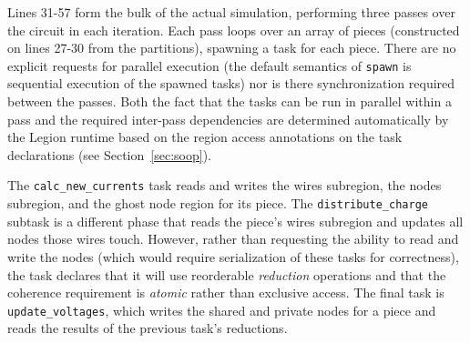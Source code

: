


Lines 31-57 form the bulk of the actual simulation, performing three passes
over the circuit in each iteration.  Each pass loops over an array of pieces (constructed on lines 27-30 from the partitions),
spawning a task for each piece.   There are no explicit requests for
parallel execution (the default semantics of {\tt spawn} is sequential 
execution of the spawned tasks) nor is there synchronization required between the
passes.  Both the fact that the tasks can be run in parallel within a pass
and the required inter-pass dependencies are determined automatically
by the Legion runtime based on the region access annotations on the task declarations
(see Section~\ref{sec:soop}).

The  {\tt calc\_new\_currents} task reads and writes the wires subregion, 
the nodes subregion, and the ghost node region for its piece.
The {\tt distribute\_charge} subtask is a different phase that reads the piece's 
wires subregion and updates all nodes those wires touch.  However,
rather than requesting the ability to read and write the nodes (which would
require serialization of these tasks for correctness), the task declares that
it will use reorderable {\em reduction} operations and that the coherence requirement
is {\em atomic} rather than exclusive access. The final task is 
{\tt update\_voltages}, which writes the shared and private nodes for a piece
and reads the results of the previous task's reductions.

